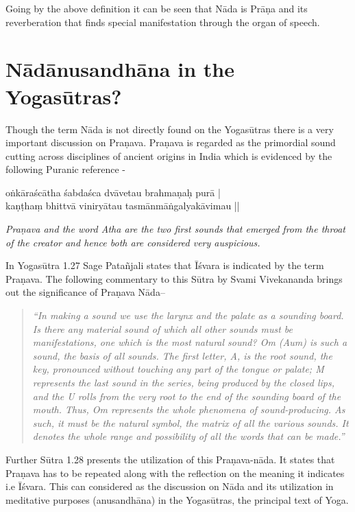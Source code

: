 Going by the above definition it can be seen that Nāda is Prāṇa and its reverberation that finds special manifestation through the organ of speech. 
  
\section*{Nādānusandhāna in the Yogasūtras?}

Though the term Nāda is not directly found on the Yogasūtras there is a very important discussion on Praṇava. Praṇava is regarded as the primordial sound cutting across disciplines of ancient origins in India which is evidenced by the following Puranic reference -

\begin{shloka}
oṅkāraścātha śabdaśca dvāvetau brahmaṇaḥ purā |\\
kaṇṭhaṃ bhittvā viniryātau tasmānmāṅgalyakāvimau ||\\
\end{shloka}

\textit{Praṇava and the word Atha are the two first sounds that emerged from the throat of the creator and hence both are considered very auspicious.}

In Yogasūtra 1.27 Sage Patañjali states that Īśvara is indicated by the term Praṇava. The following commentary to this Sūtra by Svami Vivekananda brings out the significance of Praṇava Nāda– 

\begin{quote}
\textit{“In making a sound we use the larynx and the palate as a sounding board. Is there any material sound of which all other sounds must be manifestations, one which is the most natural sound? Om (Aum) is such a sound, the basis of all sounds. The first letter, A, is the root sound, the key, pronounced without touching any part of the tongue or palate; M represents the last sound in the series, being produced by the closed lips, and the U rolls from the very root to the end of the sounding board of the mouth. Thus, Om represents the whole phenomena of sound-producing. As such, it must be the natural symbol, the matrix of all the various sounds. It denotes the whole range and possibility of all the words that can be made.”}
\end{quote}

Further Sūtra 1.28 presents the utilization of this Praṇava-nāda. It states that Praṇava has to be repeated along with the reflection on the meaning it indicates i.e Īśvara. This can considered as the discussion on Nāda and its utilization in meditative purposes (anusandhāna)  in the Yogasūtras, the principal text of Yoga.

